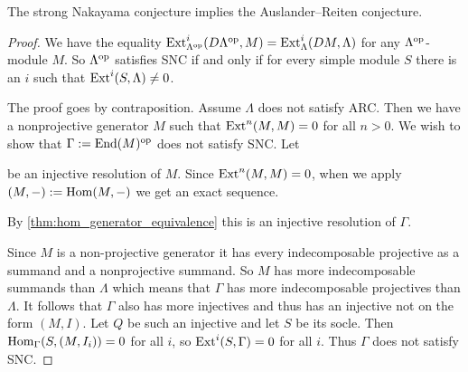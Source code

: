 \begin{theorem}\label{thm:SNC_implies_ARC}
	The strong Nakayama conjecture implies the Auslander--Reiten conjecture.
	\begin{proof}
		We have the equality $\operatorname{Ext}^i_{\Lambda^{\operatorname{op}}}(D{\Lambda^{\operatorname{op}}}, M) = \operatorname{Ext}^i_\Lambda(DM, \Lambda)$ for any ${\Lambda^{\operatorname{op}}}$-module $M$. So ${\Lambda^{\operatorname{op}}}$ satisfies SNC if and only if for every simple module $S$ there is an $i$ such that $\operatorname{Ext}^i(S, \Lambda) \neq 0$.
		
		The proof goes by contraposition. Assume $\Lambda$ does not satisfy ARC. Then we have a nonprojective generator $M$ such that $\operatorname{Ext}^n(M, M)=0$ for all $n>0$. We wish to show that $\Gamma := \operatorname{End}(M)^{\operatorname{op}}$ does not satisfy SNC. Let
		\begin{center}
		\end{center}
		be an injective resolution of $M$. Since $\operatorname{Ext}^n(M,M)=0$, when we apply $(M,-):=\operatorname{Hom}(M,-)$ we get an exact sequence.
		\begin{center}
		\end{center}
		By \cref{thm:hom_generator_equivalence} this is an injective resolution of $\Gamma$.
		
		Since $M$ is a non-projective generator it has every indecomposable projective as a summand and a nonprojective summand. So $M$ has more indecomposable summands than $\Lambda$ which means that $\Gamma$ has more indecomposable projectives than $\Lambda$. It follows that $\Gamma$ also has more injectives and thus has an injective not on the form $(M, I)$. Let $Q$ be such an injective and let $S$ be its socle. Then $\operatorname{Hom}_\Gamma(S, (M, I_i)) = 0$ for all $i$, so $\operatorname{Ext}^i(S, \Gamma) = 0$ for all $i$. Thus $\Gamma$ does not satisfy SNC.
	\end{proof}
\end{theorem}

